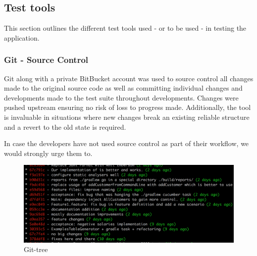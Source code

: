 \pagebreak
\subsection{Test tools}
This section outlines the different test tools used - or to be used - in testing the application. 
\subsubsection{Git - Source Control}
Git along with a private BitBucket account was used to source control all changes made to the original source code as well as committing individual changes and developments made to the test suite throughout developments. Changes were pushed upstream ensuring no risk of loss to progress made. Additionally, the tool is invaluable in situations where new changes break an existing reliable structure and a revert to the old state is required. 
\par 
In case the developers have not used source control as part of their workflow, we would strongly urge them to. 

\begin{figure}[H]
\centering
\includegraphics[scale=0.5]{res/git-tree.png}
\caption{Git-tree}
\end{figure}
